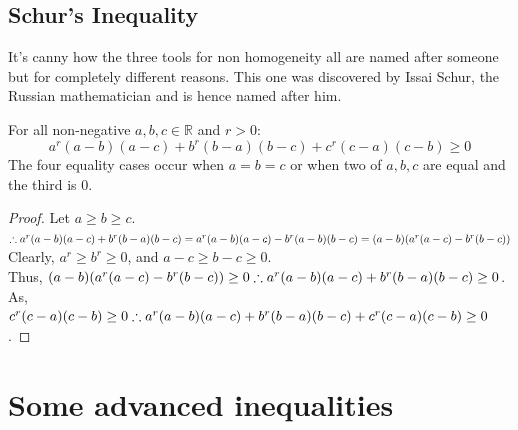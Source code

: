 \subsection{Schur's Inequality}
It's canny how the three tools for non homogeneity all are named after someone but for completely different reasons. This one was discovered by Issai Schur, the Russian mathematician and is hence named after him.
\begin{theorem}
     For all non-negative $a,b,c \in \mathbb{R}$ and $r>0$:
\[a^r(a-b)(a-c)+b^r(b-a)(b-c)+c^r(c-a)(c-b) \geq 0\]
The four equality cases occur when $a=b=c$ or when two of $a,b,c$ are equal and the third is ${0}$.
\end{theorem}
\begin{proof}
    Let $a\geq b\geq c$.\\
    $\therefore a^r(a-b)(a-c)+b^r(b-a)(b-c)\\
    = a^r(a-b)(a-c)-b^r(a-b)(b-c)\\
    = (a-b)(a^r(a-c)-b^r(b-c))$\\ 
    Clearly, $a^r \geq b^r \geq 0$, and $a-c \geq b-c \geq 0$.\\ 
    Thus, $(a-b)(a^r(a-c)-b^r(b-c)) \geq 0\\
    \therefore a^r(a-b)(a-c)+b^r(b-a)(b-c) \geq 0$.\\ 
    As, $c^r(c-a)(c-b) \geq 0\\
    \therefore a^r(a-b)(a-c)+b^r(b-a)(b-c)+c^r(c-a)(c-b) \geq 0$.
\end{proof}

\section{Some advanced inequalities}
